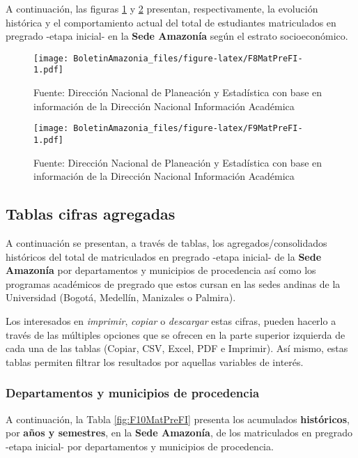 \documentclass[
]{book}
\begin{document}
A continuación, las figuras \ref{fig:F8MatPreFI} y \ref{fig:F9MatPreFI} presentan, respectivamente, la evolución histórica y el comportamiento actual del total de estudiantes matriculados en pregrado -etapa inicial- en la \textbf{Sede Amazonía} según el estrato socioeconómico.

\begin{figure}
\centering
\texttt{[image: BoletinAmazonia\_files/figure-latex/F8MatPreFI-1.pdf]}
\caption{\label{fig:F8MatPreFI}Fuente: Dirección Nacional de Planeación y Estadística con base en información de la Dirección Nacional Información Académica}
\end{figure}

\begin{figure}
\centering
\texttt{[image: BoletinAmazonia\_files/figure-latex/F9MatPreFI-1.pdf]}
\caption{\label{fig:F9MatPreFI}Fuente: Dirección Nacional de Planeación y Estadística con base en información de la Dirección Nacional Información Académica}
\end{figure}

\hypertarget{tablas-cifras-agregadas-5}{%
\subsection{Tablas cifras agregadas}\label{tablas-cifras-agregadas-5}}

A continuación se presentan, a través de tablas, los agregados/consolidados históricos del total de matriculados en pregrado -etapa inicial- de la \textbf{Sede Amazonía} por departamentos y municipios de procedencia así como los programas académicos de pregrado que estos cursan en las sedes andinas de la Universidad (Bogotá, Medellín, Manizales o Palmira).

Los interesados en \emph{imprimir}, \emph{copiar} o \emph{descargar} estas cifras, pueden hacerlo a través de las múltiples opciones que se ofrecen en la parte superior izquierda de cada una de las tablas (Copiar, CSV, Excel, PDF e Imprimir). Así mismo, estas tablas permiten filtrar los resultados por aquellas variables de interés.

\hypertarget{departamentos-y-municipios-de-procedencia-3}{%
\subsubsection{Departamentos y municipios de procedencia}\label{departamentos-y-municipios-de-procedencia-3}}

A continuación, la Tabla \ref{fig:F10MatPreFI} presenta los acumulados \textbf{históricos}, por \textbf{años y semestres}, en la \textbf{Sede Amazonía}, de los matriculados en pregrado -etapa inicial- por departamentos y municipios de procedencia.
\end{document}
